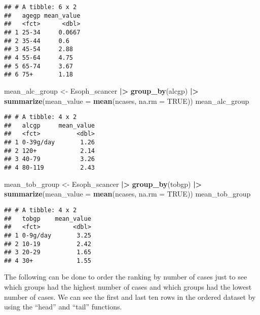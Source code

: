 \documentclass[
]{article}
\newenvironment{Shaded}{\begin{snugshade}}{\end{snugshade}}
\newcommand{\AttributeTok}[1]{\textcolor[rgb]{0.13,0.29,0.53}{#1}}
\newcommand{\ConstantTok}[1]{\textcolor[rgb]{0.56,0.35,0.01}{#1}}
\newcommand{\FunctionTok}[1]{\textcolor[rgb]{0.13,0.29,0.53}{\textbf{#1}}}
\newcommand{\NormalTok}[1]{#1}
\newcommand{\OtherTok}[1]{\textcolor[rgb]{0.56,0.35,0.01}{#1}}
\newcommand{\SpecialCharTok}[1]{\textcolor[rgb]{0.81,0.36,0.00}{\textbf{#1}}}
\begin{document}
\begin{verbatim}
## # A tibble: 6 x 2
##   agegp mean_value
##   <fct>      <dbl>
## 1 25-34     0.0667
## 2 35-44     0.6   
## 3 45-54     2.88  
## 4 55-64     4.75  
## 5 65-74     3.67  
## 6 75+       1.18
\end{verbatim}

\begin{Shaded}
\begin{Highlighting}[]
\NormalTok{mean\_alc\_group }\OtherTok{\textless{}{-}}\NormalTok{ Esoph\_scancer }\SpecialCharTok{|\textgreater{}} 
  \FunctionTok{group\_by}\NormalTok{(alcgp) }\SpecialCharTok{|\textgreater{}} 
  \FunctionTok{summarize}\NormalTok{(}\AttributeTok{mean\_value =} \FunctionTok{mean}\NormalTok{(ncases, }\AttributeTok{na.rm =} \ConstantTok{TRUE}\NormalTok{))}
\NormalTok{mean\_alc\_group}
\end{Highlighting}
\end{Shaded}

\begin{verbatim}
## # A tibble: 4 x 2
##   alcgp     mean_value
##   <fct>          <dbl>
## 1 0-39g/day       1.26
## 2 120+            2.14
## 3 40-79           3.26
## 4 80-119          2.43
\end{verbatim}

\begin{Shaded}
\begin{Highlighting}[]
\NormalTok{mean\_tob\_group }\OtherTok{\textless{}{-}}\NormalTok{ Esoph\_scancer }\SpecialCharTok{|\textgreater{}} 
  \FunctionTok{group\_by}\NormalTok{(tobgp) }\SpecialCharTok{|\textgreater{}} 
  \FunctionTok{summarize}\NormalTok{(}\AttributeTok{mean\_value =} \FunctionTok{mean}\NormalTok{(ncases, }\AttributeTok{na.rm =} \ConstantTok{TRUE}\NormalTok{))}
\NormalTok{mean\_tob\_group}
\end{Highlighting}
\end{Shaded}

\begin{verbatim}
## # A tibble: 4 x 2
##   tobgp    mean_value
##   <fct>         <dbl>
## 1 0-9g/day       3.25
## 2 10-19          2.42
## 3 20-29          1.65
## 4 30+            1.55
\end{verbatim}

The following can be done to order the ranking by number of cases just
to see which groups had the highest number of cases and which groups had
the lowest number of cases. We can see the first and last ten rows in
the ordered dataset by using the ``head'' and ``tail'' functions.
\end{document}
